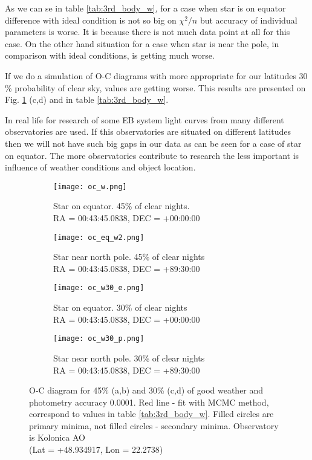 As we can se in table \ref{tab:3rd_body_w}, for a case when star is on equator difference with ideal condition is not so big on $\chi^2/n$ but accuracy of individual parameters is worse. It is because there is not much data point at all for this case.
On the other hand situation for a case when star is near the pole, in comparison with ideal conditions, is getting much worse. 

If we do a simulation of O-C diagrams with more appropriate for our latitudes 30 \% probability of clear sky, values are getting worse. This results are presented on Fig. \ref{fig:oc_weather} (c,d) and in table \ref{tab:3rd_body_w}.

In real life for research of some EB system light curves from many different observatories are used. If this observatories are situated on different latitudes then we will not have such big gaps in our data as can be seen for a case of star on equator. The more observatories contribute to research the less important is influence of weather conditions and object location.
\begin{figure}[!h]
    \centering
    \begin{subfigure}[t]{0.5\textwidth}
        \centering
        \texttt{[image: oc\_w.png]}
        \caption{Star on equator. 45\% of clear nights.\\RA = 00:43:45.0838, DEC = +00:00:00}
    \end{subfigure}%
    \begin{subfigure}[t]{0.5\textwidth}
        \centering
        \texttt{[image: oc\_eq\_w2.png]}
        \caption{Star near north pole. 45\% of clear nights\\RA = 00:43:45.0838, DEC = +89:30:00}
    \end{subfigure}
    
    \begin{subfigure}[t]{0.5\textwidth}
        \centering
        \texttt{[image: oc\_w30\_e.png]}
        \caption{Star on equator. 30\% of clear nights\\RA = 00:43:45.0838, DEC = +00:00:00}
    \end{subfigure}%
    \begin{subfigure}[t]{0.5\textwidth}
        \centering
        \texttt{[image: oc\_w30\_p.png]}
        \caption{Star near north pole. 30\% of clear nights\\RA = 00:43:45.0838, DEC = +89:30:00}
    \end{subfigure}
    \caption{O-C diagram for 45\% (a,b) and 30\% (c,d) of good weather and photometry accuracy 0.0001.
    Red line - fit with MCMC method, correspond to values in table \ref{tab:3rd_body_w}. Filled circles are primary minima, not filled circles - secondary minima. Observatory is Kolonica AO \\(Lat = +48.934917, Lon = 22.2738)}
\label{fig:oc_weather}
\end{figure}


